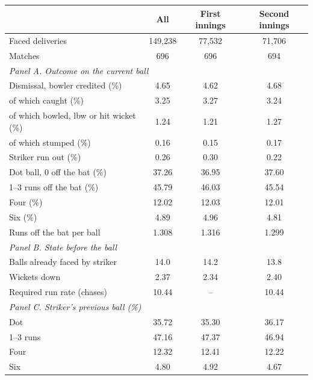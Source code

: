 \begin{tabular}{lccc}
\toprule
 & All & First innings & Second innings \\
\midrule
Faced deliveries & 149,238 & 77,532 & 71,706 \\
Matches & 696 & 696 & 694 \\
\multicolumn{4}{l}{\emph{Panel A. Outcome on the current ball}} \\
Dismissal, bowler credited (\%) & 4.65 & 4.62 & 4.68 \\
\quad of which caught (\%) & 3.25 & 3.27 & 3.24 \\
\quad of which bowled, lbw or hit wicket (\%) & 1.24 & 1.21 & 1.27 \\
\quad of which stumped (\%) & 0.16 & 0.15 & 0.17 \\
Striker run out (\%) & 0.26 & 0.30 & 0.22 \\
Dot ball, 0 off the bat (\%) & 37.26 & 36.95 & 37.60 \\
1--3 runs off the bat (\%) & 45.79 & 46.03 & 45.54 \\
Four (\%) & 12.02 & 12.03 & 12.01 \\
Six (\%) & 4.89 & 4.96 & 4.81 \\
Runs off the bat per ball & 1.308 & 1.316 & 1.299 \\
\multicolumn{4}{l}{\emph{Panel B. State before the ball}} \\
Balls already faced by striker & 14.0 & 14.2 & 13.8 \\
Wickets down & 2.37 & 2.34 & 2.40 \\
Required run rate (chases) & 10.44 & -- & 10.44 \\
\multicolumn{4}{l}{\emph{Panel C. Striker's previous ball (\%)}} \\
Dot & 35.72 & 35.30 & 36.17 \\
1--3 runs & 47.16 & 47.37 & 46.94 \\
Four & 12.32 & 12.41 & 12.22 \\
Six & 4.80 & 4.92 & 4.67 \\
\bottomrule
\end{tabular}
